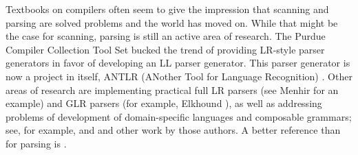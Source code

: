 Textbooks on compilers often seem to give the impression that scanning and parsing are solved problems and the world has moved on. While that might be the case for scanning, parsing is still an active area of research. The Purdue Compiler Collection Tool Set bucked the trend of providing LR-style parser generators in favor of developing an LL parser generator. This parser generator is now a project in itself, ANTLR (ANother Tool for Language Recognition) \citep{Parr:ANTLR:1995}. Other areas of research are implementing practical full LR parsers (see Menhir \citep{Pottier:Menhir:2007} for an example) and GLR parsers (for example, Elkhound \cite{McPeak:Elkhound:2002}), as well as addressing problems of development of domain-specific languages and composable grammars; see, for example, \citet{Wyk:Context-aware:2007} and \citet{Bravenboer:Concrete:2004} and other work by those authors.\nocite{Bravenboer:Declarative:2006}\nocite{Bravenboer:Preventing:2007} A better reference than \citet{Aho:Compilers:2006} for parsing is \citet{Grune:Parsing:2007}.